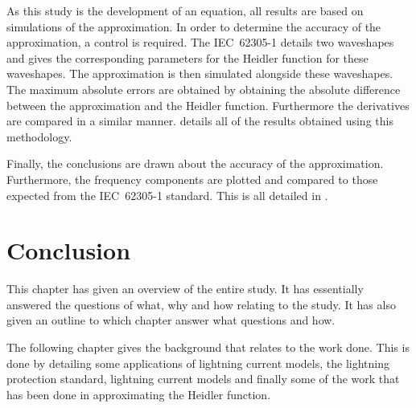 As this study is the development of an equation, all results are based on simulations of the approximation. In order to determine the accuracy of the approximation, a control is required. The IEC~62305-1 details two waveshapes and gives the corresponding parameters for the Heidler function for these waveshapes. The approximation is then simulated alongside these waveshapes. The maximum absolute errors are obtained by obtaining the absolute difference between the approximation and the Heidler function. Furthermore the derivatives are compared in a similar manner.  details all of the results obtained using this methodology.

Finally, the conclusions are drawn about the accuracy of the approximation. Furthermore, the frequency components are plotted and compared to those expected from the IEC~62305-1 standard. This is all detailed in .


\section{Conclusion}
\label{sec:approach_conclusion}
This chapter has given an overview of the entire study. It has essentially answered the questions of what, why and how relating to the study. It has also given an outline to which chapter answer what questions and how.

The following chapter gives the background that relates to the work done. This is done by detailing some applications of lightning current models, the lightning protection standard, lightning current models and finally some of the work that has been done in approximating the Heidler function.
